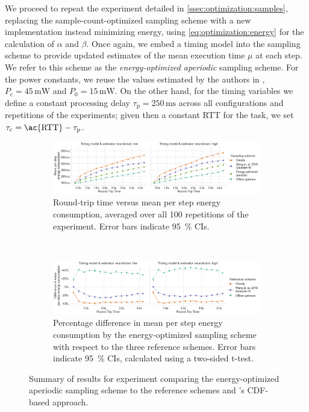 We proceed to repeat the experiment detailed in \cref{ssec:optimization:samples}, replacing the sample-count-optimized sampling scheme with a new implementation instead minimizing energy, using \cref{eq:optimization:energy} for the calculation of \( \alpha \) and \( \beta \).
Once again, we embed a timing model into the sampling scheme to provide updated estimates of the mean execution time \( \mu \) at each step.
We refer to this scheme as the \emph{energy-optimized aperiodic} sampling scheme.
For the power constants, we reuse the values estimated by the authors in \textcite{Moothedath2022EnergyEfficient}, \( P_\text{c} = 45\,\si{\milli\watt} \) and \( P_\text{0} = 15\,\si{\milli\watt} \).
On the other hand, for the timing variables we define a constant processing delay \( \tau_\text{p} = 250\,\si{\milli\second} \) across all configurations and repetitions of the experiments; given then a constant \ac{RTT} for the task, we set \( \tau_\text{c} = \text{\ac{RTT}} - \tau_\text{p} \).

\begin{figure}
    \centering
    \begin{subfigure}[t]{\textwidth}
        \centering
        \includegraphics[width=\textwidth]{figs/new_model/energy_optimization.png}
        \caption{%
            Round-trip time versus mean per step energy consumption, averaged over all \num{100} repetitions of the experiment.
            Error bars indicate \SI{95}{\percent} \acp{CI}.
        }
    \end{subfigure}\\
    \medskip
    \begin{subfigure}[t]{\textwidth}
        \centering
        \includegraphics[width=\textwidth]{figs/new_model/energy_optimization_diff.png}
        \caption{%
            Percentage difference in mean per step energy consumption by the energy-optimized sampling scheme with respect to the three reference schemes.
            Error bars indicate \SI{95}{\percent} \acp{CI}, calculated using a two-sided t-test.
        }
    \end{subfigure}
    \caption{%
        Summary of results for experiment comparing the energy-optimized aperiodic sampling scheme to the reference schemes and \textcite{Wang2019Towards}'s \ac{CDF}-based approach.
    }\label{fig:optimization:energy}
\end{figure}

